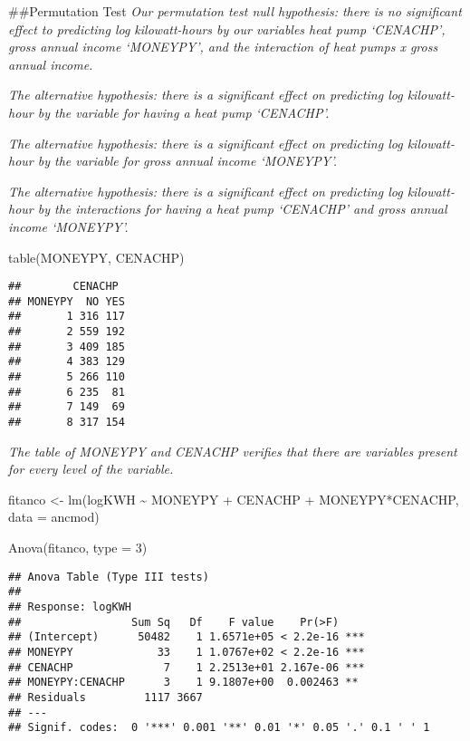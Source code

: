 \documentclass[
]{article}
\newenvironment{Shaded}{\begin{snugshade}}{\end{snugshade}}
\newcommand{\AttributeTok}[1]{\textcolor[rgb]{0.77,0.63,0.00}{#1}}
\newcommand{\DecValTok}[1]{\textcolor[rgb]{0.00,0.00,0.81}{#1}}
\newcommand{\FunctionTok}[1]{\textcolor[rgb]{0.00,0.00,0.00}{#1}}
\newcommand{\NormalTok}[1]{#1}
\newcommand{\OtherTok}[1]{\textcolor[rgb]{0.56,0.35,0.01}{#1}}
\newcommand{\SpecialCharTok}[1]{\textcolor[rgb]{0.00,0.00,0.00}{#1}}
\begin{document}
\#\#Permutation Test \emph{Our permutation test null hypothesis: there
is no significant effect to predicting log kilowatt-hours by our
variables heat pump `CENACHP', gross annual income `MONEYPY', and the
interaction of heat pumps x gross annual income.}

\emph{The alternative hypothesis: there is a significant effect on
predicting log kilowatt-hour by the variable for having a heat pump
`CENACHP'.}

\emph{The alternative hypothesis: there is a significant effect on
predicting log kilowatt-hour by the variable for gross annual income
`MONEYPY'.}

\emph{The alternative hypothesis: there is a significant effect on
predicting log kilowatt-hour by the interactions for having a heat pump
`CENACHP' and gross annual income `MONEYPY'.}

\begin{Shaded}
\begin{Highlighting}[]
\FunctionTok{table}\NormalTok{(MONEYPY, CENACHP)}
\end{Highlighting}
\end{Shaded}

\begin{verbatim}
##        CENACHP
## MONEYPY  NO YES
##       1 316 117
##       2 559 192
##       3 409 185
##       4 383 129
##       5 266 110
##       6 235  81
##       7 149  69
##       8 317 154
\end{verbatim}

\emph{The table of MONEYPY and CENACHP verifies that there are variables
present for every level of the variable.}

\begin{Shaded}
\begin{Highlighting}[]
\NormalTok{fitanco }\OtherTok{\textless{}{-}} \FunctionTok{lm}\NormalTok{(logKWH }\SpecialCharTok{\textasciitilde{}}\NormalTok{ MONEYPY }\SpecialCharTok{+}\NormalTok{ CENACHP }\SpecialCharTok{+}\NormalTok{ MONEYPY}\SpecialCharTok{*}\NormalTok{CENACHP, }\AttributeTok{data =}\NormalTok{ ancmod)}

\FunctionTok{Anova}\NormalTok{(fitanco, }\AttributeTok{type =} \DecValTok{3}\NormalTok{) }
\end{Highlighting}
\end{Shaded}

\begin{verbatim}
## Anova Table (Type III tests)
## 
## Response: logKWH
##                 Sum Sq   Df    F value    Pr(>F)    
## (Intercept)      50482    1 1.6571e+05 < 2.2e-16 ***
## MONEYPY             33    1 1.0767e+02 < 2.2e-16 ***
## CENACHP              7    1 2.2513e+01 2.167e-06 ***
## MONEYPY:CENACHP      3    1 9.1807e+00  0.002463 ** 
## Residuals         1117 3667                         
## ---
## Signif. codes:  0 '***' 0.001 '**' 0.01 '*' 0.05 '.' 0.1 ' ' 1
\end{verbatim}
\end{document}
